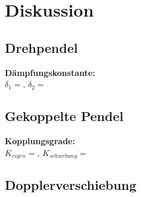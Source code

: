 \documentclass{article}
\begin{document}
\section{Diskussion}
\subsection*{Drehpendel}
\textbf{Dämpfungskonstante:}\\
$\delta_1=$, $\delta_2=$

\subsection*{Gekoppelte Pendel}
\textbf{Kopplungsgrade:}\\
$K_{eigen}=$, $K_{schwebung}=$
\subsection*{Dopplerverschiebung}



\end{document}
